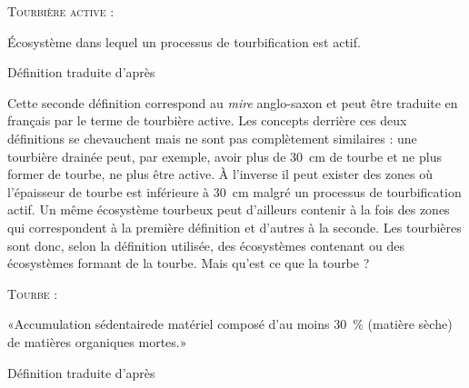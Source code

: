 \begin{pdef}
\textsc{Tourbière active} :

Écosystème dans lequel un processus de tourbification est actif.

\hfill {\scriptsize Définition traduite d'après \citet{joosten2002}}
\end{pdef}
Cette seconde définition correspond au \textit{mire} anglo-saxon et peut être traduite en français par le terme de tourbière active.
Les concepts derrière ces deux définitions se chevauchent mais ne sont pas complètement similaires : une tourbière drainée peut, par exemple, avoir plus de \SI{30}{cm} de tourbe et ne plus former de tourbe, ne plus être active.
À l'inverse il peut exister des zones où l'épaisseur de tourbe est inférieure à \SI{30}{cm} malgré un processus de tourbification actif.
Un même écosystème tourbeux peut d'ailleurs contenir à la fois des zones qui correspondent à la première définition et d'autres à la seconde.
Les tourbières sont donc, selon la définition utilisée, des écosystèmes contenant ou des écosystèmes formant de la tourbe.
Mais qu'est ce que la tourbe ?

\begin{pdef}
\textsc{Tourbe} :

«Accumulation sédentaire\footnotemark de matériel composé d'au moins \SI{30}{\percent} (matière sèche) de matières organiques mortes.»

\hfill {\scriptsize Définition traduite d'après \citet{joosten2002}}
\end{pdef}

